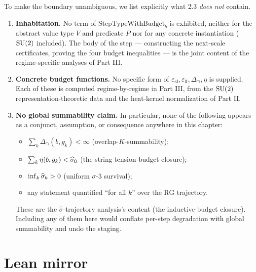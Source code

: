 To make the boundary unambiguous, we list explicitly what 2.3 \emph{does not} contain.

\begin{enumerate}
  \item \textbf{Inhabitation.}  No term of $\mathrm{StepTypeWithBudget}_b$ is exhibited, neither for the abstract value type $V$ and predicate $P$ nor for any concrete instantiation ($\mathrm{SU}(2)$ included).  The body of the step --- constructing the next-scale certificates, proving the four budget inequalities --- is the joint content of the regime-specific analyses of Part III.
  \item \textbf{Concrete budget functions.}  No specific form of $\varepsilon_{\mathrm{sf}}, \varepsilon_{\mathrm{lf}}, \Delta_{\cap}, \eta$ is supplied.  Each of these is computed regime-by-regime in Part III, from the $\mathrm{SU}(2)$ representation-theoretic data and the heat-kernel normalization of Part II.
  \item \textbf{No global summability claim.}  In particular, none of the following appears as a conjunct, assumption, or consequence anywhere in this chapter:
  \begin{itemize}
    \item $\sum_k \Delta_{\cap}(b, g_k) < \infty$ (overlap-$K$-summability);
    \item $\sum_k \eta(b, g_k) < \widehat{\sigma}_0$ (the string-tension-budget closure);
    \item $\inf_k \widehat{\sigma}_k > 0$ (uniform $\sigma$-3 survival);
    \item any statement quantified ``for all $k$'' over the RG trajectory.
  \end{itemize}
  These are the $\widehat\sigma$-trajectory analysis's content (the inductive-budget closure).  Including any of them here would conflate per-step degradation with global summability and undo the staging.
\end{enumerate}

\section{Lean mirror}
\label{sec:lean}

